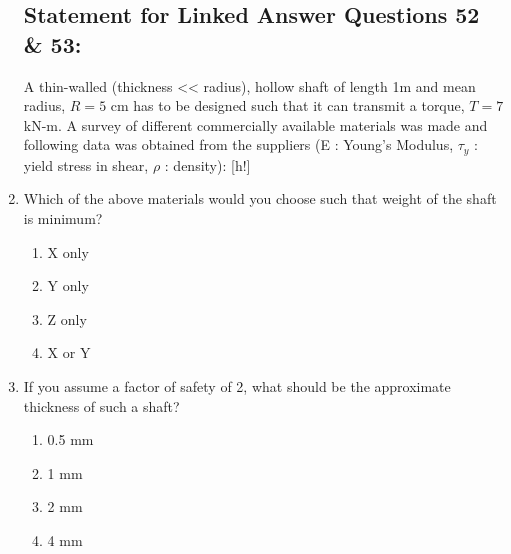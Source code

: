 \documentclass[journal]{IEEEtran}
\begin{document}
\begin{enumerate}
\subsection*{Statement for Linked Answer Questions 52 \& 53:}
A thin-walled (thickness << radius), hollow shaft of length 1m and mean radius, $R = 5$ cm has to be designed such that it can transmit a torque, $T = 7$ kN-m. A survey of different commercially available materials was made and following data was obtained from the suppliers (E : Young's Modulus, $\tau_y$ : yield stress in shear, $\rho$ : density):
[h!]
\item Which of the above materials would you choose such that weight of the shaft is minimum?
\begin{multicols}{2}
    \begin{enumerate}
        \item X only
        \item Y only
        \item Z only
        \item X or Y
    \end{enumerate}
\end{multicols}
\item If you assume a factor of safety of 2, what should be the approximate thickness of such a shaft?
\begin{multicols}{2}
    \begin{enumerate}
        \item 0.5 mm
        \item 1 mm
        \item 2 mm
        \item 4 mm
    \end{enumerate}
\end{multicols}
\end{enumerate}
\end{document}
